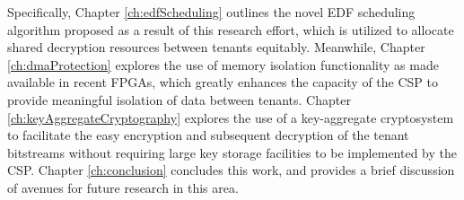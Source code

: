 Specifically, Chapter \ref{ch:edfScheduling} outlines the novel EDF scheduling algorithm proposed as a result of this research effort, which is utilized to allocate shared decryption resources between tenants equitably. Meanwhile, Chapter \ref{ch:dmaProtection} explores the use of memory isolation functionality as made available in recent FPGAs, which greatly enhances the capacity of the CSP to provide meaningful isolation of data between tenants. Chapter \ref{ch:keyAggregateCryptography} explores the use of a key-aggregate cryptosystem to facilitate the easy encryption and subsequent decryption of the tenant bitstreams without requiring large key storage facilities to be implemented by the CSP. Chapter \ref{ch:conclusion} concludes this work, and provides a brief discussion of avenues for future research in this area.